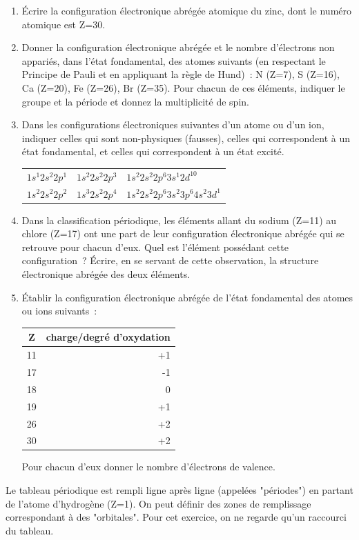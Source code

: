 \begin{enumerate}[\bf 1)]
\item \'Ecrire la configuration \'electronique abrégée atomique du zinc, dont le num\'ero 
atomique est Z=30.

\item Donner la configuration \'electronique abrégée et le nombre d'\'electrons non 
appari\'es, dans l'\'etat fondamental, des atomes suivants (en respectant le 
Principe de Pauli et en appliquant la r\`egle de Hund)~: N (Z=7), S (Z=16), 
Ca (Z=20), Fe (Z=26), Br (Z=35).
Pour chacun de ces éléments, indiquer le groupe et la période et donnez la multiplicité de spin.

\item Dans les configurations \'electroniques suivantes d'un atome ou d'un ion, 
indiquer celles qui sont non-physiques (fausses), celles qui correspondent 
\`a un \'etat fondamental, et celles qui correspondent \`a un \'etat excit\'e.

\begin{center}
\begin{tabular}{lll}
$1s^1 2s^2 2p^1$ & $1s^2 2s^2 2p^3$ & $1s^2 2s^2 2p^6 3s^1 2d^{10}$         \\
$1s^2 2s^2 2p^2$ & $1s^3 2s^2 2p^4$ & $1s^2 2s^2 2p^6 3s^2 3p^6 4s^2 3d^1$  \\
\end{tabular}
\end{center}

\item Dans la classification p\'eriodique, les \'el\'ements allant du sodium 
(Z=11) au chlore (Z=17) ont une part de leur configuration \'electronique abrégée qui 
se retrouve pour chacun d'eux. Quel est l'\'el\'ement poss\'edant cette 
configuration~?  \'Ecrire, en se servant de cette observation, la structure 
\'electronique abrégée des deux \'el\'ements.

\item \'Etablir la configuration \'electronique abrégée de l'\'etat fondamental 
des atomes ou ions suivants~:

\begin{center}
\begin{tabular}{c|r}\hline
Z & charge/degré d'oxydation \\\hline
11 & +1 \\\hline
17 & -1 \\\hline
18 & 0  \\\hline
19 & +1 \\\hline
26 & +2 \\\hline
30 & +2 \\\hline
\end{tabular}
\end{center}

Pour chacun d'eux donner le nombre d'\'electrons de valence.

\end{enumerate}
%
Le tableau p\'eriodique est rempli ligne apr\`es ligne (appel\'ees "p\'eriodes") en partant
de l'atome d'hydrog\`ene (Z=1). On peut d\'efinir des zones de remplissage correspondant \`a des
"orbitales". Pour cet exercice, on ne regarde qu'un raccourci du tableau.

